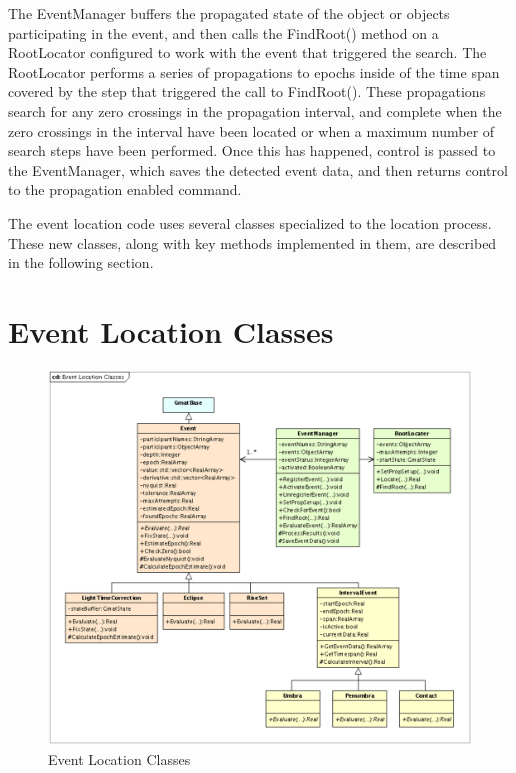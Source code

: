 The EventManager buffers the propagated state of the object or objects participating in the event, and then calls the FindRoot() method on a RootLocator configured to work with the event that triggered the search.  The RootLocator performs a series of propagations to epochs inside of the time span covered by the step that triggered the call to FindRoot().  These propagations search for any zero crossings in the propagation interval, and complete when the zero crossings in the interval have been located or when a maximum number of search steps have been performed.  Once this has happened, control is passed to the EventManager, which saves the detected event data, and then returns control to the propagation enabled command.

The event location code uses several classes specialized to the location process.  These new classes, along with key methods implemented in them, are described in the following section.

\section{\label{sec:EventLocationClasses}Event Location Classes}

\begin{figure}
\begin{center}
\includegraphics[scale=0.55]{Images/EventLocationClasses.eps}
\caption{\label{fig:EventLocationClasses}Event Location Classes}
\end{center}
\end{figure}

